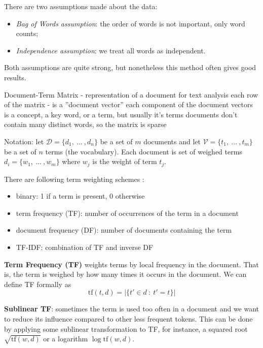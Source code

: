 There are two assumptions made about the data:

\begin{itemize}
\itemsep1pt\parskip0pt
  \item \emph{Bag of Words assumption}: the order of words is not important,
     only word counts;
  \item \emph{Independence assumption}: we treat all words as independent.
\end{itemize}


Both assumptions are quite strong, but nonetheless this method often
gives good results.


Document-Term Matrix - representation of a document for text analysis
each row of the matrix - is a ''document vector''
each component of the document vectors is a concept, a key word, or a term, but usually it's terms
documents don't contain many distinct words, so the matrix is sparse


Notation:
let $\mathcal D = \{d_1, \ ... \ , d_n \}$ be a set of $m$ documents
and let $\mathcal V = \{t_1, \ ... \ , t_m \}$ be a set of $n$ terms (the vocabulary).
Each document is set of weighed terms $d_i = \{ w_1, \ ... \ , w_m \}$
where $w_j$ is the weight of term $t_j$.

There are following term weighting schemes \cite{manning2008introduction}:

\begin{itemize}
\itemsep1pt\parskip0pt
  \item binary: 1 if a term is present, 0 otherwise
  \item term frequency (TF): number of occurrences of the term in a document
  \item document frequency (DF): number of documents containing the term
  \item TF-IDF: combination of TF and inverse DF
\end{itemize}


\textbf{Term Frequency (TF)} weights terms by local frequency in the document.
That is, the term is weighed by how many times it occurs in the document.
We can define TF formally as
$$\text{tf}(t, d) = \big| \{ t' \in d  \ : \ t' = t \} \big|$$


\textbf{Sublinear TF}: sometimes the term is used too often in
a document and we want to reduce its influence compared to
other less frequent tokens. This can be done by applying
some sublinear transformation to TF, for instance, a squared root
$\sqrt{\text{tf}(w, d)}$ or a logarithm $\log \text{tf}(w, d)$.


